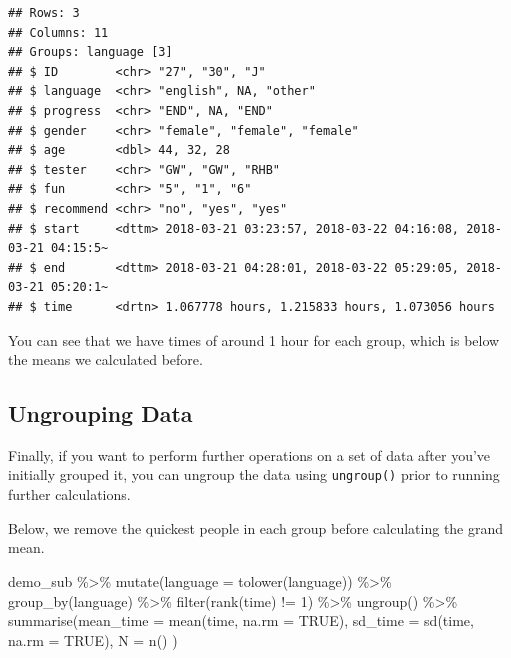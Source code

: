 \documentclass[
]{book}
\newenvironment{Shaded}{\begin{snugshade}}{\end{snugshade}}
\newcommand{\AttributeTok}[1]{\textcolor[rgb]{0.77,0.63,0.00}{#1}}
\newcommand{\ConstantTok}[1]{\textcolor[rgb]{0.00,0.00,0.00}{#1}}
\newcommand{\DecValTok}[1]{\textcolor[rgb]{0.00,0.00,0.81}{#1}}
\newcommand{\FunctionTok}[1]{\textcolor[rgb]{0.00,0.00,0.00}{#1}}
\newcommand{\NormalTok}[1]{#1}
\newcommand{\SpecialCharTok}[1]{\textcolor[rgb]{0.00,0.00,0.00}{#1}}
\begin{document}
\begin{verbatim}
## Rows: 3
## Columns: 11
## Groups: language [3]
## $ ID        <chr> "27", "30", "J"
## $ language  <chr> "english", NA, "other"
## $ progress  <chr> "END", NA, "END"
## $ gender    <chr> "female", "female", "female"
## $ age       <dbl> 44, 32, 28
## $ tester    <chr> "GW", "GW", "RHB"
## $ fun       <chr> "5", "1", "6"
## $ recommend <chr> "no", "yes", "yes"
## $ start     <dttm> 2018-03-21 03:23:57, 2018-03-22 04:16:08, 2018-03-21 04:15:5~
## $ end       <dttm> 2018-03-21 04:28:01, 2018-03-22 05:29:05, 2018-03-21 05:20:1~
## $ time      <drtn> 1.067778 hours, 1.215833 hours, 1.073056 hours
\end{verbatim}

You can see that we have times of around 1 hour for each group, which is below the means we calculated before.

\hypertarget{ungrouping-data}{%
\subsection{Ungrouping Data}\label{ungrouping-data}}

Finally, if you want to perform further operations on a set of data after you've initially grouped it, you can ungroup the data using \texttt{ungroup()} prior to running further calculations.

Below, we remove the quickest people in each group before calculating the grand mean.

\begin{Shaded}
\begin{Highlighting}[]
\NormalTok{demo\_sub }\SpecialCharTok{\%\textgreater{}\%} 
  \FunctionTok{mutate}\NormalTok{(}\AttributeTok{language =} \FunctionTok{tolower}\NormalTok{(language)) }\SpecialCharTok{\%\textgreater{}\%}
  \FunctionTok{group\_by}\NormalTok{(language) }\SpecialCharTok{\%\textgreater{}\%}
  \FunctionTok{filter}\NormalTok{(}\FunctionTok{rank}\NormalTok{(time) }\SpecialCharTok{!=} \DecValTok{1}\NormalTok{) }\SpecialCharTok{\%\textgreater{}\%}
  \FunctionTok{ungroup}\NormalTok{() }\SpecialCharTok{\%\textgreater{}\%}
  \FunctionTok{summarise}\NormalTok{(}\AttributeTok{mean\_time =} \FunctionTok{mean}\NormalTok{(time, }\AttributeTok{na.rm =} \ConstantTok{TRUE}\NormalTok{),}
            \AttributeTok{sd\_time =} \FunctionTok{sd}\NormalTok{(time, }\AttributeTok{na.rm =} \ConstantTok{TRUE}\NormalTok{),}
            \AttributeTok{N =} \FunctionTok{n}\NormalTok{()}
\NormalTok{            )}
\end{Highlighting}
\end{Shaded}
\end{document}
